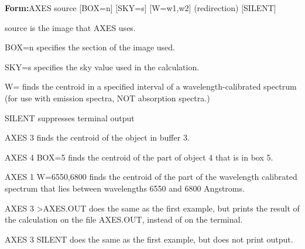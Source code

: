 {\newpage\clearpage
{}%
\begin{command}
  \item[\textbf{Form:}AXES source {[BOX=n]} {[SKY=s]} {[W=w1,w2]} (redirection) {[SILENT]}\hfill]{}
  \item[source\hfill]{is the image that AXES uses.}
  \item[BOX=n\hfill]{specifies the section of the image used.}
  \item[SKY=s\hfill]{specifies the sky value used in the calculation.}
  \item[W=\hfill]{finds the centroid in a specified interval
of a wavelength-calibrated spectrum (for use
with emission spectra, NOT absorption spectra.)}
  \item[SILENT \hfill]{suppresses terminal output}
\end{command}%
\lthtmlfigureZ
\lthtmlcheckvsize\clearpage}

{\newpage\clearpage
{}%
\begin{example}
  \item[AXES 3\hfill]{finds the centroid of the object in buffer 3.}
  \item[AXES 4 BOX=5\hfill]{finds the centroid of the part of
       object 4 that is in box 5.}
  \item[AXES 1 W=6550,6800\hfill]{finds the centroid of the part of
       the wavelength calibrated spectrum that lies between wavelengths 6550
       and 6800 Angstroms.}
  \item[AXES 3 >AXES.OUT\hfill]{does the same as the first example,
       but prints the result of the calculation on the file AXES.OUT, 
       instead of on the terminal.}
  \item[AXES 3 SILENT\hfill]{does the same as the first example,
       but does not print output.}
\end{example}%
\lthtmlfigureZ
\lthtmlcheckvsize\clearpage}

